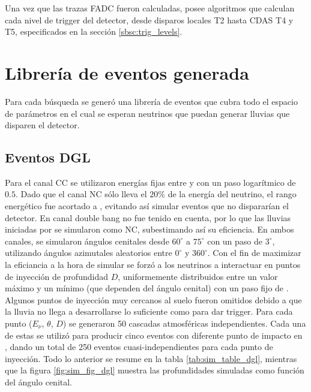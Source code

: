 		Una vez que las trazas FADC fueron calculadas, \Offline{} posee algoritmos que calculan cada nivel de trigger del detector, desde disparos locales T2 hasta CDAS T4 y T5, especificados en la secci\'on \ref{sbsc:trig_levels}.
		
	\section{Librería de eventos generada}
	\label{sc:libGen}
	
	Para cada búsqueda se generó una librería de eventos que cubra todo el espacio de parámetros en el cual se esperan neutrinos que puedan generar lluvias que disparen el detector.
	
		\subsection{Eventos DGL}
		
		Para el canal CC se utilizaron energías fijas entre  y  con un paso logarítmico de $0.5$. 
		Dado que el canal NC sólo lleva el $20\%$ de la energía del neutrino, el rango energético fue acortado a , evitando así simular eventos que no dispararían el detector.
		En canal double bang no fue tenido en cuenta, por lo que las lluvias iniciadas por \nutau{} se simularon como NC, subestimando así su eficiencia.
		En ambos canales, se simularon ángulos cenitales desde $60^\circ$ a $75^\circ$ con un paso de $3^\circ$, utilizando ángulos azimutales aleatorios entre $0^\circ$ y $360^\circ$.
		Con el fin de maximizar la eficiancia a la hora de simular se forzó a los neutrinos a interactuar en puntos de inyección de profundidad $D$, uniformemente distribuidos entre un valor máximo y un mínimo (que dependen del ángulo cenital) con un paso fijo de .
		Algunos puntos de inyección muy cercanos al suelo fueron omitidos debido a que la lluvia no llega a desarrollarse lo suficiente como para dar trigger.
		Para cada punto ($E_{\nu}$, $\theta$, $D$) se generaron 50 cascadas atmosféricas independientes.
		Cada una de estas se utilizó para producir cinco eventos con diferente punto de impacto en \Offline{}, dando un total de 250 eventos cuasi-independientes para cada punto de inyección.
		Todo lo anterior se resume en la tabla \ref{tab:sim_table_dgl}, mientras que la figura \ref{fig:sim_fig_dgl} muestra las profundidades simuladas como función del ángulo cenital.
		
